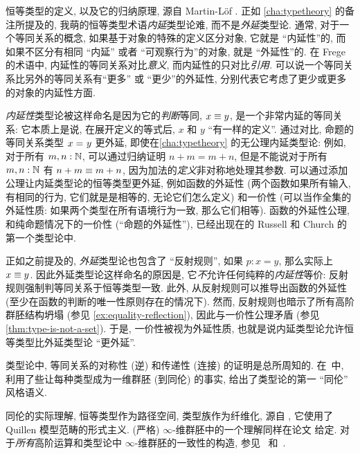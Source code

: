 \sectionNotes

恒等类型的定义, 以及它的归纳原理, 源自 Martin-L\"of \cite{Martin-Lof-1972}.
%
%
%
%
%
正如 \cref{cha:typetheory} 的备注所提及的, 我萌的恒等类型术语\emph{内延}类型论难, 而不是\emph{外延}类型论.
通常, 对于一个等同关系的概念, 如果基于对象的特殊的定义区分对象, 它就是 ``内延性''的, 而如果不区分有相同 ``内延'' 或者 ``可观察行为''的对象, 就是 ``外延性''的.
在 Frege 的术语中, 内延性的等同关系对比\emph{意义}, 而内延性的只对比\emph{引用}.
可以说一个等同关系比另外的等同关系有``更多'' 或 ``更少''的外延性, 分别代表它考虑了更少或更多的对象的内延性方面.

\emph{内延性}类型论被这样命名是因为它的\emph{判断}等同, $x\equiv y$, 是一个非常内延的等同关系: 它本质上是说, 在展开定义的等式后, $x$ 和 $y$ ``有一样的定义''.
通过对比, 命题的等同关系类型 $x =_{} y$ 更外延, 即使在\cref{cha:typetheory} 的无公理内延类型论: 例如, 对于所有 $m,n:\mathbb{N}$, 可以通过归纳证明 $n+m=m+n$, 但是不能说对于所有 $m,n:\mathbb{N}$ 有 $n+m\equiv m+n$, 因为加法的\emph{定义}非对称地处理其参数.
可以通过添加公理让内延类型论的恒等类型更外延, 例如函数的外延性 (两个函数如果所有输入, 有相同的行为, 它们就是是相等的, 无论它们怎么定义) 和一价性 (可以当作全集的外延性质: 如果两个类型在所有语境行为一致, 那么它们相等).
函数的外延性公理, 和纯命题情况下的一价性 (``命题的外延性''), 已经出现在的 Russell 和 Church 的第一个类型论中.

正如之前提及的, \emph{外延}类型论也包含了 ``反射规则'', 如果 $p:x=y$, 那么实际上 $x\equiv y$.
因此外延类型论这样命名的原因是, 它\emph{不}允许任何纯粹的\emph{内延性}等价: 反射规则强制判等同关系于恒等类型一致.
此外, 从反射规则可以推导出函数的外延性 (至少在函数的判断的唯一性原则存在的情况下).
然而, 反射规则也暗示了所有高阶群胚结构坍塌 (参见 \cref{ex:equality-reflection}), 因此与一价性公理矛盾 (参见 \cref{thm:type-is-not-a-set}).
于是, 一价性被视为外延性质, 也就是说内延类型论允许恒等类型比外延类型论 ``更外延''.

类型论中, 等同关系的对称性 (逆) 和传递性 (连接) 的证明是总所周知的.
在~\cite{hs:gpd-typethy}中, 利用了些让每种类型成为一维群胚 (到同伦) 的事实, 给出了类型论的第一 ``同伦'' 风格语义.

同伦的实际理解, 恒等类型作为路径空间, 类型族作为纤维化, 源自 \cite{AW}, 它使用了 Quillen 模型范畴的形式主义.
(严格) $\infty$-维群胚中的一个理解同样在论文 \cite{mw:thesis} 给定.
对于\emph{所有}高阶运算和类型论中 $\infty$-维群胚的一致性的构造, 参见~\cite{pll:wkom-type} 和~\cite{bg:type-wkom}.

